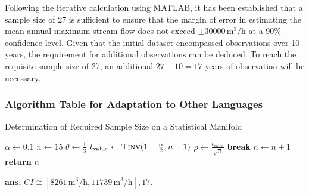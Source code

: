 \documentclass[12pt]{article}
\begin{document}
Following the iterative calculation using MATLAB, it has been established that a sample size of 27 is sufficient to ensure that the margin of error in estimating the mean annual maximum stream flow does not exceed \( \pm 30000 \, \text{m}^3/\text{h} \) at a 90\% confidence level. Given that the initial dataset encompassed observations over 10 years, the requirement for additional observations can be deduced. To reach the requisite sample size of 27, an additional \( 27 - 10 = 17 \) years of observation will be necessary.


\subsubsection*{Algorithm Table for Adaptation to Other Languages}
\begin{center}
\begin{algorithm}
\caption{Determination of Required Sample Size on a Statistical Manifold}
\begin{algorithmic}[1]
\State $\alpha \gets 0.1$ 
\State $n \gets 15$ 
\State $\theta \gets \frac{1}{3}$ 
    \State $t_{\text{value}} \gets \Call{Tinv}{1 - \frac{\alpha}{2}, n - 1}$
    \State $\rho \gets \frac{t_{\text{value}}}{\sqrt{n}}$
    \If{$\rho < \theta$}
        \State \textbf{break}
    \EndIf
    \State $n \gets n + 1$
\EndWhile
\State \textbf{return} $n$
\end{algorithmic}
\end{algorithm}
\end{center}
\vfill
\begin{flushright}
\textbf{ans.} \(CI\cong \left[8261 \, \text{m}^3/\text{h}, 11739 \, \text{m}^3/\text{h}\right], 17.\)
\end{flushright}
\newpage
\end{document}
